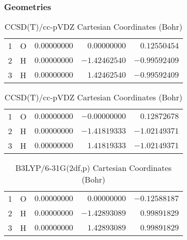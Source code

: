 \documentclass[10pt,oneside]{article}
\begin{document}
\begin{table}[h!]
\subsubsection*{Geometries}
\begin{multicols}{2}
\centering
\caption{CCSD(T)/cc-pVTZ Cartesian Coordinates (Bohr)}
\begin{tabular}{llrrr}
\toprule
1  & O  & $ 0.00000000$ & $ 0.00000000$ & $ 0.12550454$ \\
2  & H  & $ 0.00000000$ & $-1.42462540$ & $-0.99592409$ \\
3  & H  & $ 0.00000000$ & $ 1.42462540$ & $-0.99592409$ \\
\bottomrule
\end{tabular}
\caption{CCSD(T)/cc-pVDZ Cartesian Coordinates (Bohr)}
\begin{tabular}{llrrr}
\toprule
1  & O  & $ 0.00000000$ & $-0.00000000$ & $ 0.12872678$ \\
2  & H  & $ 0.00000000$ & $-1.41819333$ & $-1.02149371$ \\
3  & H  & $ 0.00000000$ & $ 1.41819333$ & $-1.02149371$ \\
\bottomrule
\end{tabular}
\end{multicols}
\end{table}

\begin{table}[h]
\centering
\caption{B3LYP/6-31G(2df,p) Cartesian Coordinates (Bohr)}
\begin{tabular}{llrrr}
\toprule
1  & O  & $ 0.00000000$ & $ 0.00000000$ & $-0.12588187$ \\
2  & H  & $ 0.00000000$ & $-1.42893089$ & $ 0.99891829$ \\
3  & H  & $ 0.00000000$ & $ 1.42893089$ & $ 0.99891829$ \\
\bottomrule
\end{tabular}
\end{table}
\end{document}
